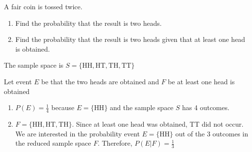 \begin{example}
    A fair coin is tossed twice.
    \begin{enumerate}
        \item Find the probability that the result is two heads.
        \item Find the probability that the result is two heads given that at least one head is obtained.
    \end{enumerate}
\end{example}

\begin{solution}
    The sample space is \( S = \{\text{HH}, \text{HT}, \text{TH}, \text{TT}\} \)

    Let event \( E \) be that the two heads are obtained and \( F \) be at least one head is obtained
    \begin{enumerate}
        \item \( P(E) = \frac{1}{4} \) because \( E = \{\text{HH}\} \) and the sample space \( S \) has 4 outcomes.
        \item \( F = \{\text{HH}, \text{HT}, \text{TH}\} \). Since at least one head was obtained, TT did not occur. We are interested in the probability event \( E = \{\text{HH}\} \) out of the 3 outcomes in the reduced sample space \( F \). Therefore, \( P(E|F) = \frac{1}{3} \)
    \end{enumerate}
\end{solution}
